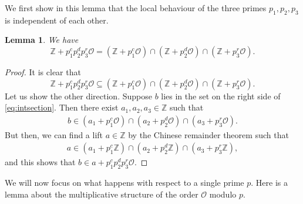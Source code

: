 \documentclass[11pt,letterpaper]{amsart}
\newtheorem{lem}[theorem]{Lemma}
\theoremstyle{definition}
\theoremstyle{remark}
\newcommand{\cal}[1]{\mathcal{#1}}
\newcommand{\bb}[1]{\mathbb{#1}}
\newcommand{\Z}{\bb Z}
\newcommand{\calO}{\cal O}
\begin{document}
	We first show in this lemma that the local behaviour of the three primes $p_1,p_2,p_3$ is independent of each 
	other.
	\begin{lem}
		\label{le:local_behaviour}
		We have 
		\begin{equation}
			\Z + p_1^c p_2^d p_3^r\calO = \left( \Z + p_1^{c}\calO\right) \cap \left( \Z + p_2^{d}\calO\right) \cap \left( \Z + p_3^{r}\calO\right)   .
		\end{equation}
	\end{lem}
	\begin{proof}
		It is clear that 
		\begin{equation}
			\Z + p_1^c p_2^d p_3^r\calO 
			\subseteq 
			\left( \Z + p_1^{c}\calO\right) \cap \left( \Z + p_2^{d}\calO\right) \cap \left( \Z + p_3^{r}\calO\right)   .
			\label{eq:intsection}
		\end{equation}
		Let us show the other direction. Suppose $b$ lies in the set on the right side of \cref{eq:intsection}. Then there exist $a_1,a_2,a_3 \in \mathbb{Z}$ such that
		\begin{align}
			b  \in (a_1 +  p_1^{c} \calO) \cap 
			(a_2 +  p_2^{d} \calO )\cap
			(a_3 +  p_3^{r} \calO).
		\end{align}
		But then, we can find a lift $a \in \mathbb{Z}$ {by the Chinese remainder theorem} such that 
		\begin{align}
			a \in (a_1 + p_1^{c} \Z )\cap (a_2 + p_2^{d} \Z )\cap (a_3 + p_3^{r} \Z ),
		\end{align}
		and this shows that $b \in a + p_1^{c}p_2^{d} p_3^{r} \calO$.
	\end{proof}
	
	We will now focus on what happens with respect to a single prime $p$. 
	\iffalse
	Here is a lemma about the multiplicative structure of the order $\calO$ modulo $p$.
	
\end{document}
